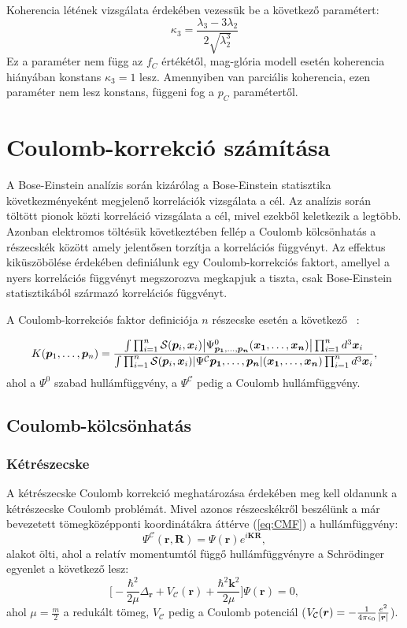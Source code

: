 \documentclass[10pt,a4paper]{article}
\numberwithin{equation}{subsection}
\numberwithin{figure}{section}
\begin{document}
Koherencia létének vizsgálata érdekében vezessük be a következő paramétert:
\begin{equation}
\kappa_3 = \frac{\lambda_3-3\lambda_2}{2\sqrt{\lambda_2^3}}
\end{equation}
Ez a paraméter nem függ az $f_C$ értékétől, mag-glória modell esetén koherencia hiányában konstans $\kappa_3=1$ lesz. Amennyiben van parciális koherencia, ezen paraméter nem lesz konstans, függeni fog a $p_C$ paramétertől.


\section{Coulomb-korrekció számítása}
A Bose-Einstein analízis során kizárólag a Bose-Einstein statisztika következményeként megjelenő korrelációk vizsgálata a cél. Az analízis során töltött pionok közti korreláció vizsgálata a cél, mivel ezekből keletkezik a legtöbb. Azonban elektromos töltésük következtében fellép a Coulomb kölcsönhatás a részecskék között amely jelentősen torzítja a korrelációs függvényt. Az effektus kiküszöbölése érdekében definiálunk egy Coulomb-korrekciós faktort, amellyel a nyers korrelációs függvényt megszorozva megkapjuk a tiszta, csak Bose-Einstein statisztikából származó korrelációs függvényt.

A Coulomb-korrekciós faktor definiciója $n$ részecske esetén a következő ~\cite{Alt:2001dj}:

\begin{equation}
K(\bm{p}_1,\dots,\bm{p}_n)=
\frac{
\int \prod_{i=1}^n\mathcal{S}(\bm{p}_i, \bm{x}_i)
\abs{\Psi^{0}_{\bm{p_1},\dots,\bm{p_n}}(\bm{x_1},\dots,\bm{x_n})}\prod_{i=1}^n d^3 \bm{x}_i
}{\int \prod_{i=1}^n\mathcal{S}(\bm{p}_i, \bm{x}_i)
\abs{\Psi^\mathcal{C}\bm{p_1},\dots,\bm{p_n}}(\bm{x_1},\dots,\bm{x_n})\prod_{i=1}^n d^3 \bm{x}_i},
\label{eq:Kn}
\end{equation}
ahol a $\Psi^0$ szabad hullámfüggvény, a $\Psi^\mathcal{C}$ pedig a Coulomb hullámfüggvény.

\subsection{Coulomb-kölcsönhatás}
\subsubsection{Kétrészecske}
A kétrészecske Coulomb korrekció meghatározása érdekében meg kell oldanunk a kétrészecske Coulomb problémát. Mivel azonos részecskékről beszélünk a már bevezetett tömegközépponti koordinátákra áttérve (\ref{eq:CMF})  a hullámfüggvény:
\begin{equation}
\Psi^\mathcal{C}(\bm{r},\bm{R}) = \Psi(\bm{r})e^{i\bm{KR}},
\end{equation}
alakot ölti, ahol a relatív momentumtól függő hullámfüggvényre a Schrödinger egyenlet a következő lesz:
\begin{equation}
\bigg[-\frac{\hbar^2}{2\mu}\Delta_{\bm{r}}+V_\mathcal{C}(\bm{r})+\frac{\hbar^2\bm{k}^2}{2\mu}\bigg]\Psi(\bm{r})=0,
\end{equation}
ahol $\mu=\frac{m}{2}$ a redukált tömeg, $V_\mathcal{C}$ pedig a Coulomb potenciál \big($V_\mathcal{C}(\bm{r}) = -\frac{1}{4\pi\epsilon_0}\frac{e^2}{\abs{\bm{r}}}$\big).
\end{document}
